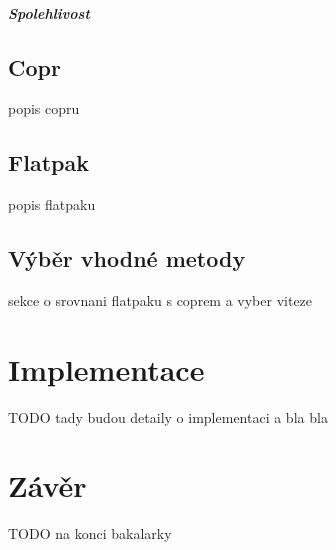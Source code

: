 \documentclass[
  digital,     %
  oneside,     %
  nosansbold,  %
  nocolorbold, %
  lof,         %
  lot,         %
]{fithesis4}
\begin{document}
 \paragraph{Spolehlivost}


\section{Copr}

popis copru


\section{Flatpak}

popis flatpaku


\section{Výběr vhodné metody}

sekce o srovnani flatpaku s coprem a vyber viteze




\chapter{Implementace}

TODO tady budou detaily o implementaci a bla bla




\chapter*{Závěr}

TODO na konci bakalarky

\printbibliography[heading=bibintoc] %
\end{document}
